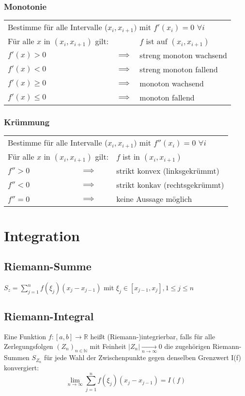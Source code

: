 \documentclass[a4paper,9pt]{extarticle}
\newcommand{\liminfty}[1][n]{\lim_{#1 \to \infty}}
\begin{document}
	\subsubsection*{Monotonie}
	\begin{tabular}{lcl}
		\multicolumn{3}{l}{Bestimme für alle Intervalle ($x_i,x_{i+1})$ mit $f'(x_i) = 0$ $\forall i$} \\
		Für alle $x$ in $(x_i,x_{i+1})$ gilt: & & $f$ ist auf $(x_i,x_{i+1})$ \\
		\hline
		$f'(x) > 0$ & $\implies$ & streng monoton wachsend \\
		$f'(x) < 0$ & $\implies$ & streng monoton fallend \\
		$f'(x) ≥ 0$ & $\implies$ & monoton wachsend\\
		$f'(x) ≤ 0$ & $\implies$ & monoton fallend \\
	\end{tabular}

	\subsubsection*{Krümmung}
	\begin{tabular}{lcl}
		\multicolumn{3}{l}{Bestimme für alle Intervalle ($x_i,x_{i+1})$ mit $f''(x_i) = 0$ $\forall i$} \\
		\multicolumn{2}{l}{Für alle $x$ in $(x_i,x_{i+1})$ gilt:} & $f$ ist in $(x_i,x_{i+1})$ \\
		\hline
		$f'' > 0$ & $\implies$ & strikt konvex (linksgekrümmt) \\
		$f'' < 0$ & $\implies$ & strikt konkav (rechtsgekrümmt) \\
		$f'' = 0$ & $\implies$ & keine Aussage möglich \\	
	\end{tabular}

	\pagebreak
	
\section*{Integration}
	
	\subsection*{Riemann-Summe}
	$S_z = \sum_{j=1}^n f(\xi_j)(x_j - x_{j-1})$ mit $\xi_j \in [x_{j-1},x_j], 1 ≤ j ≤ n$
	
	\subsection*{Riemann-Integral}
	Eine Funktion $f : [a,b] → \mathbb{R}$ heißt (Riemann-)integrierbar, falls für alle Zerlegungsfolgen $(Z_n)_{n \in \mathbb{N}}$ mit Feinheit $|Z_n| \xrightarrow[n → ∞]{} 0$ die zugehörigen Riemann-Summen $S_{Z_n}$ für jede Wahl der Zwischenpunkte gegen denselben Grenzwert I(f) konvergiert:
	\begin{equation*}
		\liminfty {} \sum_{j=1}^n f(\xi_j)(x_j - x_{j-1}) = I(f)
	\end{equation*}
	
\end{document}
